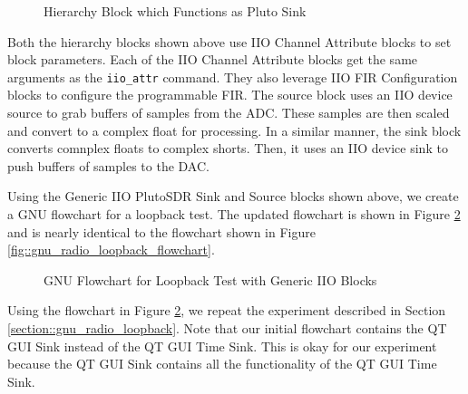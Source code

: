 \documentclass{article}
\begin{document}
\begin{figure}[H]
	\centerline{}
	\caption{Hierarchy Block which Functions as Pluto Sink}
	\label{fig::pluto_iio_device_sink}
\end{figure}

Both the hierarchy blocks shown above use IIO Channel Attribute blocks to set block parameters. Each of the IIO Channel Attribute blocks get the same arguments as the \texttt{iio\_attr} command. They also leverage  IIO FIR Configuration blocks to configure the programmable FIR. The source block uses an IIO device source to grab buffers of samples from the ADC. These samples are then scaled and convert to a complex float for processing. In a similar manner, the sink block converts comnplex floats to complex shorts. Then, it uses an IIO device sink to push buffers of samples to the DAC. 

Using the Generic IIO PlutoSDR Sink and Source blocks shown above, we create a GNU flowchart for a loopback test. The updated flowchart is shown in Figure \ref{fig::gnu_radio_loopback_generic_iio} and is nearly identical to the flowchart shown in Figure \ref{fig::gnu_radio_loopback_flowchart}.

\begin{figure}[H]
	\centerline{}
	\caption{GNU Flowchart for Loopback Test with Generic IIO Blocks}
	\label{fig::gnu_radio_loopback_generic_iio}
\end{figure}

Using the flowchart in Figure \ref{fig::gnu_radio_loopback_generic_iio}, we repeat the experiment described in Section \ref{section::gnu_radio_loopback}. Note that our initial flowchart contains the QT GUI Sink instead of the QT GUI Time Sink. This is okay for our experiment because the QT GUI Sink contains all the functionality of the QT GUI Time Sink.
\end{document}
